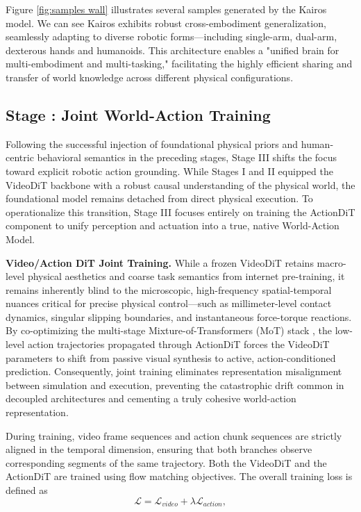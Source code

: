 Figure \ref{fig:samples wall} illustrates several samples generated by the Kairos model. We can see Kairos exhibits robust cross-embodiment generalization, seamlessly adapting to diverse robotic forms—including single-arm, dual-arm, dexterous hands and humanoids. This architecture enables a "unified brain for multi-embodiment and multi-tasking," facilitating the highly efficient sharing and transfer of world knowledge across different physical configurations. 



\subsection{Stage \uppercase\expandafter{}: Joint World-Action Training}

Following the successful injection of foundational physical priors and human-centric behavioral semantics in the preceding stages, Stage III shifts the focus toward explicit robotic action grounding. While Stages I and II equipped the VideoDiT backbone with a robust causal understanding of the physical world, the foundational model remains detached from direct physical execution. To operationalize this transition, Stage III focuses entirely on training the ActionDiT component to unify perception and actuation into a true, native World-Action Model.



 



\textbf {Video/Action DiT Joint Training.} While a frozen VideoDiT retains macro-level physical aesthetics and coarse task semantics from internet pre-training, it remains inherently blind to the microscopic, high-frequency spatial-temporal nuances critical for precise physical control—such as millimeter-level contact dynamics, singular slipping boundaries, and instantaneous force-torque reactions. By co-optimizing the multi-stage Mixture-of-Transformers (MoT) stack \citep{yuan2026fastwam}, the low-level action trajectories propagated through ActionDiT forces the VideoDiT parameters to shift from passive visual synthesis to active, action-conditioned prediction. Consequently, joint training eliminates representation misalignment between simulation and execution, preventing the catastrophic drift common in decoupled architectures and cementing a truly cohesive world-action representation.



During training, video frame sequences and action chunk sequences are strictly aligned in the temporal dimension, ensuring that both branches observe corresponding segments of the same trajectory. Both the VideoDiT and the ActionDiT are trained using flow matching objectives. The overall training loss is defined as
\begin{equation}
    \mathcal{L} = \mathcal{L}_{video} + \lambda\mathcal{L}_{action},
\end{equation}

